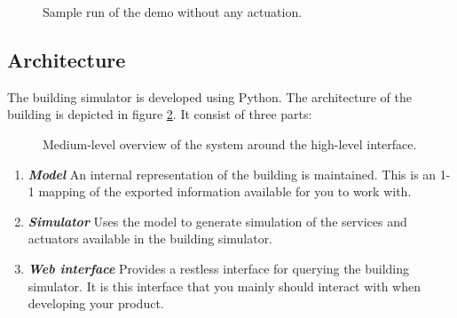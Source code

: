 \documentclass[10pt]{article}
\newcommand{\includeSVG}[1]{
  \texttt{[image: figs/\#1.pdf]}
}
\newcommand{\textdesc}[1]{\textit{\textbf{#1}}} %
\newcommand{\descitem}[1]{\item \textdesc{#1}}
\begin{document}
\begin{figure}[htb]
  \begin{center}
  \end{center}
  \caption{Sample run of the demo without any actuation.}
  \label{fig:demo}
\end{figure}

\subsection{Architecture}

The building simulator is developed using Python. The architecture of the building is depicted in
figure \ref{fig:interface:mediumlevel}. It consist of three parts:

\begin{figure}[htb]
  \begin{center}
    \rotatebox{0}{\scalebox{1.0}{\includeSVG{mediumleveloverview}}}
  \end{center}
  \caption{Medium-level overview of the system around the high-level interface.}
  \label{fig:interface:mediumlevel}
\end{figure}

\begin{enumerate}
				\descitem{Model} An internal representation of the building is maintained. This is
				an 1-1 mapping of the exported information available for you to work with.
				\descitem{Simulator} Uses the model to generate simulation of the services and
				actuators available in the building simulator.
				\descitem{Web interface} Provides a restless interface for querying the building
				simulator. It is this interface that you mainly should interact with when developing
				your product.
\end{enumerate}
\end{document}
